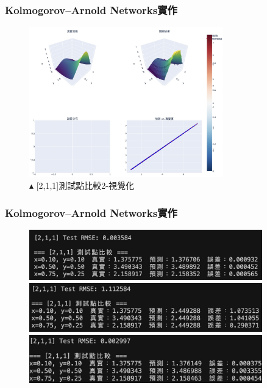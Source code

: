 \documentclass{beamer}
\begin{document}
\begin{frame}
    \frametitle{Kolmogorov–Arnold Networks實作}
    \begin{figure}
        \centering
        \includegraphics[width=0.75\textwidth,keepaspectratio]{figures/211比較2視覺化.jpeg}
        \caption*{$\blacktriangle$ [2,1,1]測試點比較2-視覺化}
    \end{figure}
\end{frame}

\begin{frame}
    \frametitle{Kolmogorov–Arnold Networks實作}
    \begin{figure}
        \centering
        \begin{minipage}{\textwidth}
            \includegraphics[width=0.9\textwidth,height=0.5\textheight,keepaspectratio]{figures/211比較1.jpg}
            \centering          
        \end{minipage}
        
        \begin{minipage}{\textwidth}
            \includegraphics[width=0.9\textwidth,height=0.5\textheight,keepaspectratio]{figures/211比較6.jpg}
            \centering
        \end{minipage}

        \begin{minipage}{\textwidth}
            \includegraphics[width=0.9\textwidth,height=0.5\textheight,keepaspectratio]{figures/211比較12.jpg}
            \centering            
        \end{minipage}
    \end{figure}
\end{frame}
\end{document}
